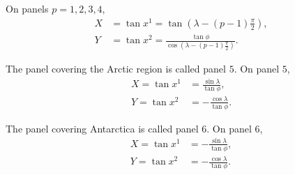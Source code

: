 \documentclass{article}
\begin{document}
On panels $p=1,2,3,4$,
\begin{align}
X&=\tan x^1 = \tan \left( \lambda -(p-1)\frac{\pi}{2} \right), \\
Y&=\tan x^2 = \frac{\tan \phi}{\cos \left( \lambda -(p-1)\frac{\pi}{2}\right)}.
\end{align}

The panel covering the Arctic region is called panel $5$. On panel $5$,
\begin{align}
X=\tan x^1&= \frac{\sin \lambda}{\tan \phi}, \\
Y=\tan x^2&=- \frac{\cos \lambda}{\tan \phi}.
\end{align}

The panel covering Antarctica is called panel $6$. On panel $6$,
\begin{align}
X=\tan x^1&=- \frac{\sin \lambda}{\tan \phi}, \\
Y=\tan x^2&=- \frac{\cos \lambda}{\tan \phi}.
\end{align}
\end{document}
